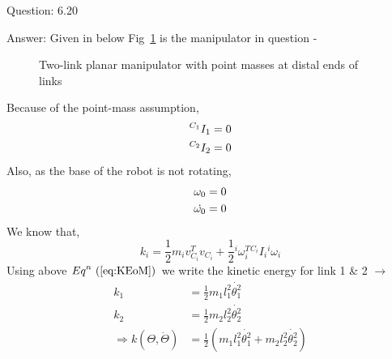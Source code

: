 \documentclass[a4paper]{article}
\begin{document}
\begin{qalist}
		\newpage
		
		\item[Question: 6.20] \setcounter{equation}{0} %
		\item[Answer:] Given in below Fig~\ref{fig:q6_20} is the manipulator in question -
			\begin{figure}[H]			
				\vspace{0.5cm}
				\centering
				\caption{Two-link planar manipulator with point masses at distal ends of links} 
				\label{fig:q6_20}
				\vspace{0.5cm}
			\end{figure}
			
			Because of the point-mass assumption, 
			\begin{align}
				{}^{{C}_{1}}{I}_{1} &= 0 \notag \\
				{}^{{C}_{2}}{I}_{2} &= 0
			\end{align}
			Also, as the base of the robot is not rotating, 
			\begin{align}
				{\omega}_{0} &= 0 \notag \\
				\dot{{\omega}_{0}} &= 0
			\end{align}
			We know that, 
			\begin{equation} \label{eq:KEoM}
				{k}_{i} = \frac{1}{2} {m}_{i} {v}^{T}_{{C}_{i}} {v}_{{C}_{i}} + \frac{1}{2} {}^{i} {\omega}^{T}_{i} {}^{{C}_{i}}{I}_{i} {}^{i}{\omega}_{i}
			\end{equation}
			Using above ${Eq}^{n}~(\ref{eq:KEoM})$ we write the kinetic energy for link 1 \& 2 $\rightarrow$
			\begin{align}
				\label{eq:KEoL1}{k}_{1} &= \frac{1}{2} {m}_{1} {l}^{2}_{1} \dot{{\theta}^{2}_{1}} \\
				\label{eq:KEoL2}{k}_{2} &= \frac{1}{2} {m}_{2} {l}^{2}_{2} \dot{{\theta}^{2}_{2}} \\
				\label{eq:KETot} \Rightarrow k(\Theta, \dot{\Theta}) &= \frac{1}{2} ({m}_{1}{l}^{2}_{1} \dot{{\theta}^{2}_{1}} + {m}_{2}{l}^{2}_{2} \dot{{\theta}^{2}_{2}})
			\end{align}	
				

\end{qalist}
\end{document}
